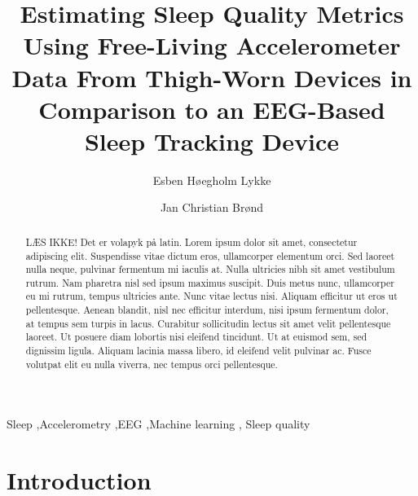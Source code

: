 \documentclass[
  super,
  preprint,
  3p]{elsarticle}
\begin{document}
\begin{frontmatter}
\title{Estimating Sleep Quality Metrics Using Free-Living Accelerometer
Data From Thigh-Worn Devices in Comparison to an EEG-Based Sleep
Tracking Device}
\author[1]{Esben Høegholm Lykke%
%
}
\author[1]{Jan Christian Brønd%
%
}




        
\begin{abstract}
LÆS IKKE! Det er volapyk på latin. Lorem ipsum dolor sit amet,
consectetur adipiscing elit. Suspendisse vitae dictum eros, ullamcorper
elementum orci. Sed laoreet nulla neque, pulvinar fermentum mi iaculis
at. Nulla ultricies nibh sit amet vestibulum rutrum. Nam pharetra nisl
sed ipsum maximus suscipit. Duis metus nunc, ullamcorper eu mi rutrum,
tempus ultricies ante. Nunc vitae lectus nisi. Aliquam efficitur ut eros
ut pellentesque. Aenean blandit, nisl nec efficitur interdum, nisi ipsum
fermentum dolor, at tempus sem turpis in lacus. Curabitur sollicitudin
lectus sit amet velit pellentesque laoreet. Ut posuere diam lobortis
nisi eleifend tincidunt. Ut at euismod sem, sed dignissim ligula.
Aliquam lacinia massa libero, id eleifend velit pulvinar ac. Fusce
volutpat elit eu nulla viverra, nec tempus orci pellentesque.
\end{abstract}





\begin{keyword}
    Sleep \sep Accelerometry \sep EEG \sep Machine learning \sep 
    Sleep quality
\end{keyword}
\end{frontmatter}
    \ifdefined\Shaded\renewenvironment{Shaded}{\begin{tcolorbox}[boxrule=0pt, sharp corners, enhanced, interior hidden, breakable, frame hidden, borderline west={3pt}{0pt}{shadecolor}]}{\end{tcolorbox}}\fi

\hypertarget{introduction}{%
\section{Introduction}\label{introduction}}
\end{document}
